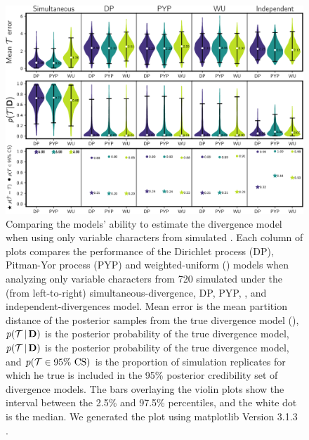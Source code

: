 \begin{figure}[htbp]
    \begin{center}
        \includegraphics[width=\textwidth,height=\textheight,keepaspectratio]{../images/from-project-repo/var-only-model-performance-violin-cropped.pdf}
        \captionsetup{name=Figure S, labelformat=noSpace, listformat=sFigList}
        \caption{
        Comparing the models' ability to estimate the divergence model
        when using only variable characters from simulated \datasets.
        Each column of plots compares the performance of the Dirichlet process
        (DP), Pitman-Yor process (PYP) and weighted-uniform (\wunif) models when
        analyzing only variable characters from 720 \datasets simulated under
        the (from left-to-right) simultaneous-divergence, DP, PYP, \wunif, and
        independent-divergences model. 
        Mean \etimesets error is the mean partition distance
        of the posterior samples from the true
        divergence model (\etimesets),
        $p(\mathcal{T} \,|\, \mathbf{D})$ is the posterior probability
        of the true divergence model,
        $p(\mathcal{T} \,|\, \mathbf{D})$ is the posterior probability of the
        true divergence model,
        and
        $p(\mathcal{T} \in \textrm{95\% CS})$ is the proportion of simulation
        replicates for which he true \etimesets is included in the 95\%
        posterior credibility set of divergence models.
        The bars overlaying the violin plots show the interval between the
        2.5\% and 97.5\% percentiles, and the white dot is the median.
        We generated the plot using matplotlib Version 3.1.3
        \citep{matplotlib}.
        }
        \label{fig:varonlymodelperformancegrid}
    \end{center}
\end{figure}

